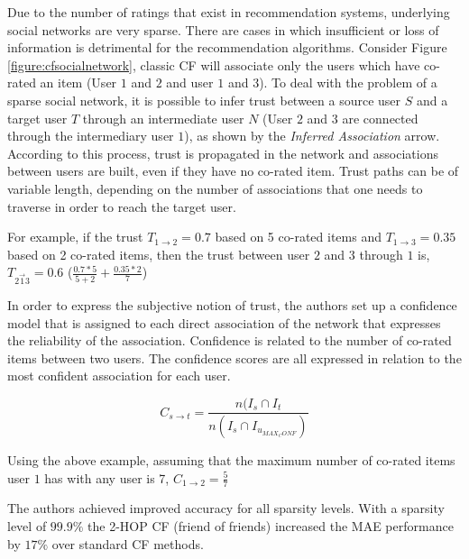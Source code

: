 Due to the number of ratings that exist in recommendation systems, underlying
social networks are very sparse. There are cases in which insufficient or loss
of information is detrimental for the recommendation algorithms. Consider
Figure \ref{figure:cfsocialnetwork}, classic CF will associate only the users
which have co-rated an item (User $1$ and $2$ and user $1$ and $3$). To deal
with the problem of a sparse social network, it is possible to infer trust
between a source user $S$ and a target user $T$ through an intermediate user
$N$ (User $2$ and $3$ are connected through the intermediary user $1$), as
shown by the \emph{Inferred Association} arrow. According to this process,
trust is propagated in the network and associations between users are built,
even if they have no co-rated item. Trust paths can be of variable length,
depending on the number of associations that one needs to traverse in order to
reach the target user.

For example, if the trust $T_{1 \rightarrow 2} = 0.7$ based on 5 co-rated items
and $T_{1 \rightarrow 3} = 0.35$ based on 2 co-rated items, then the trust
between user $2$ and $3$ through $1$ is, $T_{2 \overrightarrow{1} 3} = 0.6$
($\frac{0.7*5}{5+2} + \frac{0.35*2}{7}$)

In order to express the subjective notion of trust, the authors set up a
confidence model that is assigned to each direct association of the network
that expresses the reliability of the association. Confidence is related to the
number of co-rated items between two users. The confidence scores are all
expressed in relation to the most confident association for each user.

\begin{equation}
C_{s \rightarrow t} = \frac{n(I_{s} \cap I_{t}}{n(I_{s} \cap I_{u_{MAX_CONF}})}
\end{equation}

Using the above example, assuming that the maximum number of co-rated items
user $1$ has with any user is 7, $C_{1 \rightarrow 2} = \frac{5}{7}$

The authors achieved improved accuracy for all sparsity levels. With a sparsity
level of $99.9\%$ the 2-HOP CF (friend of friends) increased the MAE
performance by $17\%$ over standard CF methods.




